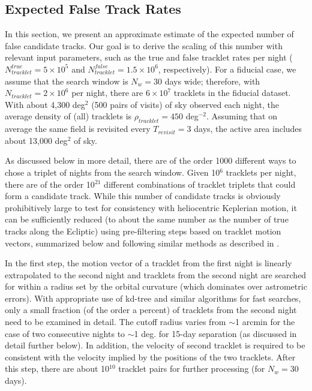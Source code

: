 \subsection{Expected False Track Rates \label{sec:tracks} }

In this section, we present an approximate estimate of the expected number of false candidate tracks.
Our goal is to derive the scaling of this number with relevant input parameters, such as the true and false
tracklet rates per night ($N_{tracklet}^{true}=5\times10^5$ and $N_{tracklet}^{false}=1.5\times10^6$, respectively).
For a fiducial case, we assume that the search window is $N_w= 30$ days wide;  therefore, with $N_{tracklet} = 2\times10^6$
per night, there are $6\times10^7$ tracklets in the fiducial dataset. With about 4,300 deg$^2$ (500 pairs of visits)
of sky observed each night, the average density of (all) tracklets is $\rho_{tracklet} = 450$ deg$^{-2}$. Assuming
that on average the same field is revisited every $T_{revisit}=3$ days, the active area includes about 13,000 deg$^2$
of sky.

As discussed below in more detail, there are of the order 1000 different ways to chose a triplet of nights
from the search window. Given 10$^6$ tracklets per night, there are of the order
10$^{21}$ different combinations of tracklet triplets that could form a candidate track.
While this number of candidate tracks is obviously prohibitively large to test for consistency
with heliocentric Keplerian motion, it can be sufficiently reduced (to about the same number
as the number of true tracks along the Ecliptic) using pre-filtering steps based on tracklet motion
vectors, summarized below and following similar methods as described in \citet{denneau13, kubica07}. 

In the first step, the motion vector of a tracklet from the first night is linearly extrapolated
to the second night and tracklets from the second night are searched for within a radius set
by the orbital curvature (which dominates over astrometric errors). With appropriate use of
kd-tree and similar algorithms for fast searches, only a small fraction (of the order a percent)
of tracklets from the second night need to be examined in detail. The cutoff radius varies
from $\sim$1 arcmin for the case of two consecutive nights to $\sim$1 deg. for 15-day separation
(as discussed in detail further below). In addition, the velocity of second tracklet is required
to be consistent with the velocity implied by the positions of the two tracklets. After
this step, there are about 10$^{10}$ tracklet pairs for further processing (for $N_w=30$
days).

